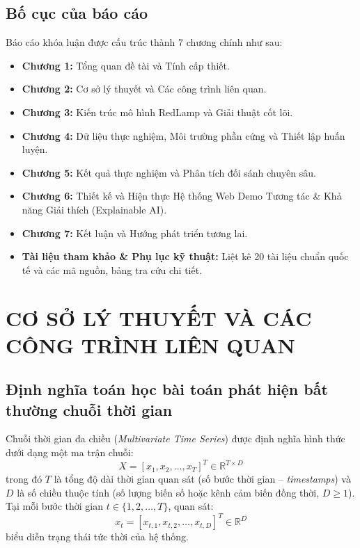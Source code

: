 \documentclass[11pt,journal,onecolumn]{IEEEtran}
\begin{document}
\subsection{Bố cục của báo cáo}
Báo cáo khóa luận được cấu trúc thành 7 chương chính như sau:
\begin{itemize}
    \item \textbf{Chương 1:} Tổng quan đề tài và Tính cấp thiết.
    \item \textbf{Chương 2:} Cơ sở lý thuyết và Các công trình liên quan.
    \item \textbf{Chương 3:} Kiến trúc mô hình RedLamp và Giải thuật cốt lõi.
    \item \textbf{Chương 4:} Dữ liệu thực nghiệm, Môi trường phần cứng và Thiết lập huấn luyện.
    \item \textbf{Chương 5:} Kết quả thực nghiệm và Phân tích đối sánh chuyên sâu.
    \item \textbf{Chương 6:} Thiết kế và Hiện thực Hệ thống Web Demo Tương tác \& Khả năng Giải thích (Explainable AI).
    \item \textbf{Chương 7:} Kết luận và Hướng phát triển tương lai.
    \item \textbf{Tài liệu tham khảo \& Phụ lục kỹ thuật:} Liệt kê 20 tài liệu chuẩn quốc tế và các mã nguồn, bảng tra cứu chi tiết.
\end{itemize}






\section{CƠ SỞ LÝ THUYẾT VÀ CÁC CÔNG TRÌNH LIÊN QUAN}
\label{sec:chapter2}

\subsection{Định nghĩa toán học bài toán phát hiện bất thường chuỗi thời gian}
Chuỗi thời gian đa chiều (\textit{Multivariate Time Series}) được định nghĩa hình thức dưới dạng một ma trận chuỗi:
\begin{equation}
\label{eq:multivariate_ts}
X = [x_1, x_2, \dots, x_T]^T \in \mathbb{R}^{T \times D}
\end{equation}
trong đó $T$ là tổng độ dài thời gian quan sát (số bước thời gian -- \textit{timestamps}) và $D$ là số chiều thuộc tính (số lượng biến số hoặc kênh cảm biến đồng thời, $D \ge 1$). Tại mỗi bước thời gian $t \in \{1, 2, \dots, T\}$, quan sát:
\begin{equation}
x_t = [x_{t,1}, x_{t,2}, \dots, x_{t,D}]^T \in \mathbb{R}^D
\end{equation}
biểu diễn trạng thái tức thời của hệ thống.
\end{document}
